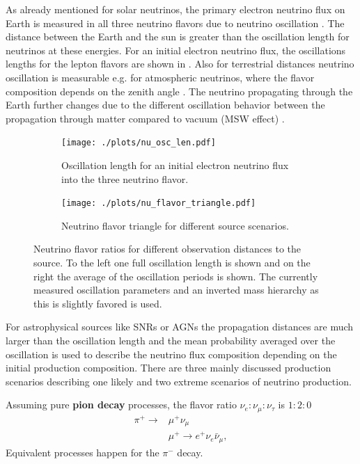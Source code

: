 As already mentioned for solar neutrinos, the primary electron neutrino flux on Earth is measured in all three neutrino flavors due to neutrino oscillation \cite{SNO01Oscillation}.
The distance between the Earth and the sun is greater than the oscillation length for neutrinos at these energies.
For an initial electron neutrino flux, the oscillations lengths for the lepton flavors are shown in .
Also for terrestrial distances neutrino oscillation is measurable e.g. for atmospheric neutrinos, where the flavor composition depends on the zenith angle \cite{SK98Oscillation}.
The neutrino propagating through the Earth further changes due to the different oscillation behavior between the propagation through matter compared to vacuum (MSW effect) \cite{Mikheyev85, Wolfenstein79}.
\begin{figure}
    \centering
    \begin{subfigure}[t]{0.47\textwidth}
        \centering
        \texttt{[image: ./plots/nu\_osc\_len.pdf]}
        \caption{Oscillation length for an initial electron neutrino flux into the three neutrino flavor.}
        \label{fig:nu_osc_len}
    \end{subfigure}
    \hfill
    \begin{subfigure}[t]{0.47\textwidth}
        \centering
        \texttt{[image: ./plots/nu\_flavor\_triangle.pdf]}
        \caption{Neutrino flavor triangle for different source scenarios.}
        \label{fig:nu_flavor_trangle}
    \end{subfigure}
    \caption{Neutrino flavor ratios for different observation distances to the source. To the left one full oscillation length is shown and on the right the average of the oscillation periods is shown. The currently measured oscillation parameters \cite{PDG20} and  an inverted mass hierarchy as this is slightly favored is used.}
    \label{fig:nu_osc}
\end{figure}

For astrophysical sources like SNRs or AGNs the propagation distances are much larger than the oscillation length and the mean probability averaged over the oscillation is used to describe the neutrino flux composition depending on the initial production composition.
There are three mainly discussed production scenarios describing one likely and two extreme scenarios of neutrino production.

Assuming pure \textbf{pion decay} processes, the flavor ratio $\nu_e : \nu_{\mu} : \nu_{\tau}$ is $1:2:0$
\begin{align}
    \pi^+ \to &\mu^+ \nu_\mu \\
    &\mu^+ \to e^+ \nu_e \bar{\nu}_{\mu} ,
\end{align}
Equivalent processes happen for the $\pi^-$ decay.

